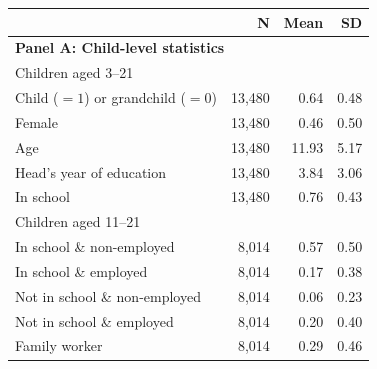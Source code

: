 \begin{center} \begin{threeparttable} \begin{tabular}{l*{3}{r}} \hline \hline 
                    &           N&        Mean&          SD\\
\hline \multicolumn{4}{l}{\textbf{Panel A: Child-level statistics}}\\
Children aged 3--21 &            &            &            \\
\hspace{5pt} Child ($=1$) or grandchild ($=0$)&      13,480&        0.64&        0.48\\
\hspace{5pt} Female &      13,480&        0.46&        0.50\\
\hspace{5pt} Age    &      13,480&       11.93&        5.17\\
\hspace{5pt} Head's year of education&      13,480&        3.84&        3.06\\
\hspace{5pt} In school&      13,480&        0.76&        0.43\\
Children aged 11--21&            &            &            \\
\hspace{5pt}  In school \& non-employed&       8,014&        0.57&        0.50\\
\hspace{5pt}  In school \& employed&       8,014&        0.17&        0.38\\
\hspace{5pt} Not in school \& non-employed&       8,014&        0.06&        0.23\\
\hspace{5pt}  Not in school \& employed&       8,014&        0.20&        0.40\\
\hspace{5pt} Family worker&       8,014&        0.29&        0.46\\
 

\end{tabular}
\end{threeparttable}
\end{center}
